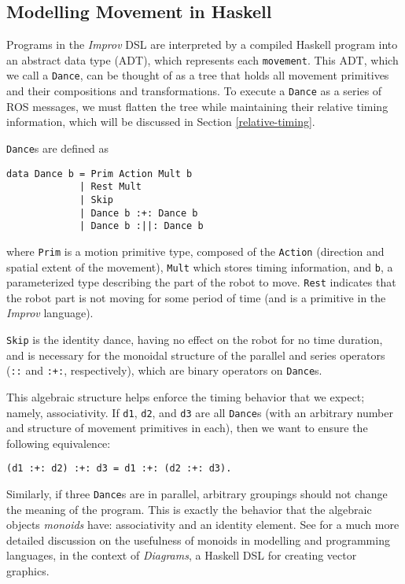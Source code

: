 \documentclass[sigchi-a]{acmart}
\begin{document}
\subsection{Modelling Movement in
Haskell}\label{modelling-movement-in-haskell}

Programs in the \emph{Improv} DSL are interpreted by a compiled Haskell
program into an abstract data type (ADT), which represents each
\texttt{movement}. This ADT, which we call a \texttt{Dance}, can be thought of as
a tree that holds all movement primitives and their compositions and
transformations. To
execute a \texttt{Dance} as a series of ROS messages, we must flatten
the tree while maintaining their relative timing information, which will
be discussed in Section \ref{relative-timing}.

\texttt{Dance}s are defined as

\begin{verbatim}
data Dance b = Prim Action Mult b
             | Rest Mult
             | Skip
             | Dance b :+: Dance b
             | Dance b :||: Dance b
\end{verbatim}

where \texttt{Prim} is a motion primitive type, composed of the
\texttt{Action} (direction and spatial extent of the movement),
\texttt{Mult} which stores timing information, and \texttt{b}, a parameterized type describing the
part of the robot to move. \texttt{Rest} indicates that the robot part
is not moving for some period of time (and is a primitive in the
\emph{Improv} language). 

\texttt{Skip} is the identity dance, having no
effect on the robot for no time duration, and is necessary for the
monoidal structure of the parallel and
series operators (\texttt{:\textbar{}\textbar{}:} and \texttt{:+:},
respectively), which are binary operators on \texttt{Dance}s.

This algebraic structure helps enforce the timing behavior that we
expect; namely, associativity. If \texttt{d1}, \texttt{d2}, and
\texttt{d3} are all \texttt{Dance}s (with an arbitrary number and
structure of movement primitives in each), then we want to ensure the
following equivalence:

\begin{verbatim}
(d1 :+: d2) :+: d3 = d1 :+: (d2 :+: d3).
\end{verbatim}

Similarly, if three \texttt{Dance}s are in parallel, arbitrary groupings
should not change the meaning of the program. This is exactly the
behavior that the algebraic objects \emph{monoids} have: 
associativity and an identity element. See \cite{yorgey2012monoids} for a much more
detailed discussion on the usefulness of monoids in modelling and
programming languages, in the context of \emph{Diagrams}, a Haskell DSL
for creating vector graphics.
\end{document}
